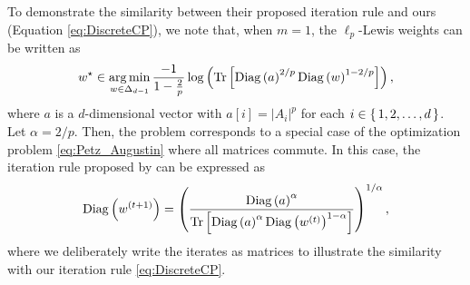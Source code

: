 \documentclass{article}
\DeclareMathOperator*{\argmin}{ \arg \min }
\begin{document}
To demonstrate the similarity between their proposed iteration rule and ours (Equation \eqref{eq:DiscreteCP}), we note that, when $m=1$, the $\ell_p$-Lewis weights can be written as 
\begin{equation}
    \label{eq:ReWrittenLewis}
    w^{\star}\in\argmin_{w\in \Delta_{d-1}}\frac{-1}{1-\frac{2}{p}}\log\left(\Tr\left[\mathrm{Diag}\left(a\right)^{2/p}\mathrm{Diag}\left(w\right)^{1-2/p}\right]\right),
\end{equation}
where $a$ is a $d$-dimensional vector with $a[i]=|A_i|^p$ for each $i\in\set{1,2,\dots,d}$.
Let $\alpha=2/p$. 
Then, the problem corresponds to a special case of the optimization problem \eqref{eq:Petz_Augustin} where all 
matrices commute.
In this case, 
the iteration rule proposed by \citet{Cohen2015}
can be expressed as
\begin{equation}
    \label{eq:RawCohenIteration}
    \mathrm{Diag}\left(w^{(t+1)}\right)=\left(\frac{\mathrm{Diag}\left(a\right)^{\alpha}}{\Tr\left[\mathrm{Diag}\left(a\right)^{\alpha}\mathrm{Diag}\left(w^{(t)}\right)^{1-\alpha}\right]}\right)^{1/\alpha} , 
\end{equation}
where we deliberately write the iterates as matrices to illustrate the similarity with our iteration rule \eqref{eq:DiscreteCP}. 
\end{document}
